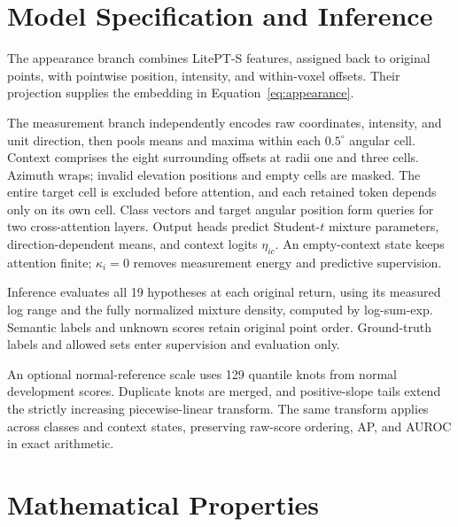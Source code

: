 \documentclass{article}
\begin{document}
\clearpage
\appendix
\section{Model Specification and Inference}
\label{app:architecture}
The appearance branch combines LitePT-S features, assigned back to original points, with pointwise position, intensity, and within-voxel offsets. Their projection supplies the embedding in Equation~\eqref{eq:appearance}.

The measurement branch independently encodes raw coordinates, intensity, and unit direction, then pools means and maxima within each $0.5^\circ$ angular cell. Context comprises the eight surrounding offsets at radii one and three cells. Azimuth wraps; invalid elevation positions and empty cells are masked. The entire target cell is excluded before attention, and each retained token depends only on its own cell. Class vectors and target angular position form queries for two cross-attention layers. Output heads predict Student-$t$ mixture parameters, direction-dependent means, and context logits $\eta_{ic}$. An empty-context state keeps attention finite; $\kappa_i=0$ removes measurement energy and predictive supervision.

Inference evaluates all 19 hypotheses at each original return, using its measured log range and the fully normalized mixture density, computed by log-sum-exp. Semantic labels and unknown scores retain original point order. Ground-truth labels and allowed sets enter supervision and evaluation only.

An optional normal-reference scale uses 129 quantile knots from normal development scores. Duplicate knots are merged, and positive-slope tails extend the strictly increasing piecewise-linear transform. The same transform applies across classes and context states, preserving raw-score ordering, AP, and AUROC in exact arithmetic.

\section{Mathematical Properties}
\label{app:theory}
\end{document}
